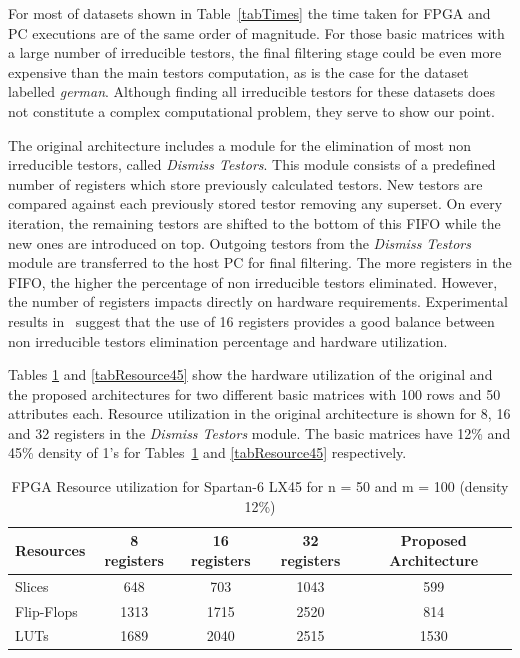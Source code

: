 \documentclass[conference]{IEEEtran}
\begin{document}
For most of datasets shown in Table~\ref{tabTimes} the time taken for FPGA and PC executions are 
of the same order of magnitude. For those basic matrices with a large number of irreducible testors, the final 
filtering stage could be  even more expensive than the main testors computation, as is the case for the dataset 
labelled \textit{german}. Although finding all irreducible testors for these datasets does not constitute 
a complex computational problem, they serve to show our point.

The original architecture includes a module for the elimination of most non irreducible testors, called 
\textit{Dismiss Testors}. This module consists of a predefined number of registers which store previously 
calculated testors. New testors are compared against each previously stored testor removing any superset. On every 
iteration, the remaining testors are shifted to the bottom of this FIFO while the new ones are introduced 
on top. Outgoing testors from the \textit{Dismiss Testors} module are transferred to the host PC for final 
filtering. The more registers in the FIFO, the higher the percentage of non irreducible testors eliminated.
However, the number of registers impacts directly on hardware requirements. Experimental results 
in~\cite{Rojas12} suggest that the use of 16 registers provides a good balance between  non irreducible testors
elimination percentage and hardware utilization. 

Tables \ref{tabResource12} and \ref{tabResource45} show the hardware utilization of the original and the 
proposed architectures for two different basic matrices with 100 rows and 50 attributes each. Resource utilization 
in the original architecture is shown for 8, 16 and 32 registers in the \textit{Dismiss Testors} module. The 
basic matrices have 12\% and 45\% density of 1's for Tables~\ref{tabResource12} and \ref{tabResource45} respectively.

\begin{table}[htb]
	\renewcommand{\arraystretch}{1.3}
	\caption{FPGA Resource utilization for Spartan-6 LX45 for n = 50 and m = 100 (density 12\%)}
	\label{tabResource12}
	\centering
	\begin{tabular}{lcccc}
	 	\hline                       
	  	Resources & 8 registers & 16 registers & 32 registers & Proposed Architecture\\
	  	\hline
	  	Slices     & 648  & 703  & 1043 & 599 \\
	  	Flip-Flops & 1313 & 1715 & 2520 & 814 \\
	  	LUTs       & 1689 & 2040 & 2515 & 1530 \\
	 	\hline 
	\end{tabular}
\end{table}
\end{document}
